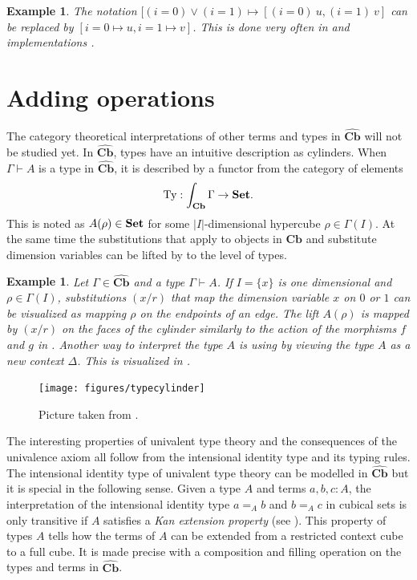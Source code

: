 \documentclass[12pt,a4paper,twoside,xetex]{book} %
\newcommand{\keyword}[1]{\emph{#1}\index{#1}}
\newtheorem{example}[theorem]{Example}
\newcommand{\psh}[1]{\widehat{#1}}
\newcommand{\cube}[0]{\textbf{Cb}}
\begin{document}
\begin{example}
The notation $[(i = 0) \vee (i=1) \mapsto [(i=0) \ u, (i=1)\  v]$ can 
be replaced by $[i=0 \mapsto u, i=1 \mapsto v]$. This is done very often in 
\cite{Huber2016} and implementations \cite{Moertberg2018}.
\end{example}


\section{Adding operations}\label{extraops}

The category theoretical interpretations of other 
terms and types in $\psh{\cube}$ will not be studied yet. In $\psh{\cube}$, types have an intuitive description as cylinders. When $\Gamma \vdash A$ is a type in $\psh{\cube}$, it is described by a functor from the category of elements 
$$\text{Ty}:\int_{\cube} \Gamma \rightarrow \set.$$ This is noted as $A(\rho) \in \text{\textbf{Set}}$ for some $|I|$-dimensional hypercube $\rho 
\in \Gamma (I)$. At the same time the substitutions that apply to objects in $\cube$ and substitute dimension variables can 
be lifted by  to the level of types. 

\begin{example}
Let $\Gamma  \in \psh{\cube}$ and a type $\Gamma \vdash A$. If $I=\{x\}$ is one dimensional and $\rho \in \Gamma(I)$, substitutions $(x/r)$ that 
map the dimension variable $x$ on $0$ or $1$ can be visualized as mapping $\rho$ on the endpoints of an edge. The lift $A(\rho)$ is mapped by $(x/r)$ on the faces of the 
cylinder similarly to the action of the morphisms $f$ and $g$ in . Another way to interpret the type $A$ is using  by viewing the type $A$ as a new context $\Delta$.  This is visualized in . 
\end{example}

\begin{figure}\label{hubtypes}
 \centering
 \texttt{[image: figures/typecylinder]}
 \caption{Picture taken from \cite{Huber2016def}.}
\end{figure}

The interesting properties of univalent type theory and the 
consequences of the univalence axiom all follow from the intensional identity 
type and its typing rules. The intensional identity type of univalent type 
theory can be modelled in $\psh{\cube}$ but it is special in the following 
sense. Given a type $A$ and terms $a,b,c:A$, the interpretation of the 
intensional identity type $a =_A b$ and $b=_A c$  in cubical sets is only 
transitive if $A$ satisfies a \keyword{Kan extension property} (see 
). This property of types $A$ tells how the terms of $A$ can be 
extended from a restricted context cube to a full cube. It is made precise with 
a composition and filling operation on the types and terms in $\psh{\cube}$.
\end{document}
